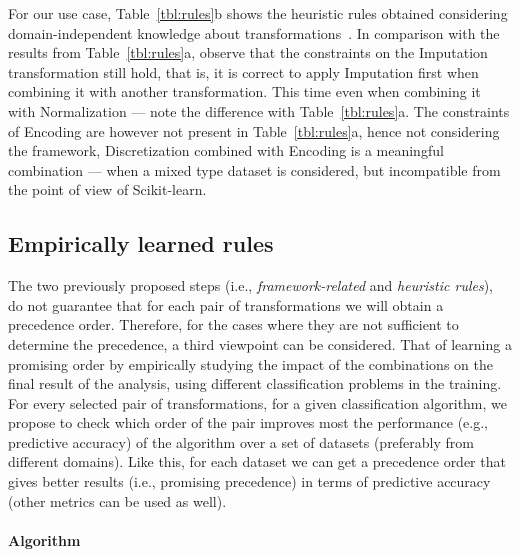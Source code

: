\begin{example}
For our use case, Table~\ref{tbl:rules}b shows the heuristic rules obtained considering domain-independent knowledge about transformations~\cite{BookExploratoryDM03Dasu}. In comparison with the results from Table~\ref{tbl:rules}a, observe that the constraints on the Imputation transformation still hold, that is, it is correct to apply Imputation first when combining it with another transformation. This time even when combining it with Normalization --- note the difference with Table~\ref{tbl:rules}a. The constraints of Encoding are however not present in Table~\ref{tbl:rules}a, hence not considering the framework, Discretization combined with Encoding is a meaningful combination --- when a mixed type dataset is considered, but incompatible from the point of view of Scikit-learn.
\end{example}

\subsection{Empirically learned rules}
\label{sec:rules-learned}

The two previously proposed steps (i.e., \textit{framework-related} and \textit{heuristic rules}), do not guarantee that for each pair of transformations we will obtain a precedence order. Therefore, for the cases where they are not sufficient to determine the precedence, a third viewpoint can be considered. That of learning a promising order by empirically studying the impact of the combinations on the final result of the analysis, using different classification problems in the training. For every selected pair of transformations, for a given classification algorithm, we propose to check which order of the pair improves most the performance (e.g., predictive accuracy) of the algorithm over a set of datasets (preferably from different domains). Like this, for each dataset we can get a precedence order that gives better results (i.e., promising precedence) in terms of predictive accuracy (other metrics can be used as well). 

\paragraph{Algorithm}
\label{sec:rules-learned:algorithm}

